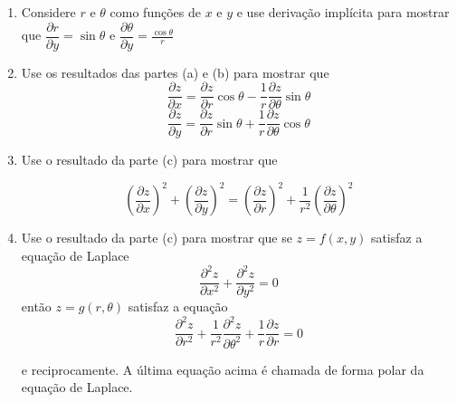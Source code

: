 \documentclass[11pt,a4paper]{article}
\begin{document}
\begin{enumerate}
\begin{enumerate}
		\item Considere $r$ e $\theta$ como funções de $x$ e $y$ e use derivação implícita para mostrar que
		$\dfrac{\partial r}{\partial y} = \sin \theta $ e $\dfrac{\partial \theta}{\partial y} = \displaystyle\frac{\cos \theta}{r}$
		
		\item Use os resultados das partes (a) e (b) para mostrar que 
		$$\dfrac{\partial z}{\partial x} = \dfrac{\partial z}{\partial r} \cos \theta - \displaystyle\frac{1}{r}\dfrac{\partial z}{\partial \theta} \sin \theta$$
		$$\dfrac{\partial z}{\partial y} = \dfrac{\partial z}{\partial r} \sin \theta + \displaystyle\frac{1}{r}\dfrac{\partial z}{\partial \theta} \cos \theta$$
		
		\item Use o resultado da parte (c) para mostrar que 
		
		 $$\left(\dfrac{\partial z}{\partial x}\right)^2 + \left(\dfrac{\partial z}{\partial y}\right)^2 = \left(\dfrac{\partial z}{\partial r}\right)^2 + \displaystyle\frac{1}{r^2}\left(\dfrac{\partial z}{\partial \theta}\right)^2$$
		
		\item Use o resultado da parte (c) para mostrar que se $z = f(x,y)$ satisfaz a equação de Laplace
		$$\dfrac{\partial^2 z}{\partial x^2} + \dfrac{\partial^2 z}{\partial y^2} = 0$$
		então $z = g(r, \theta)$ satisfaz a equação 
		$$\dfrac{\partial^2 z}{\partial r^2} + \displaystyle\frac{1}{r^2}\dfrac{\partial^2 z}{\partial \theta^2} + \displaystyle\frac{1}{r}\dfrac{\partial z}{\partial r} = 0$$
		
		e reciprocamente. A última equação acima é chamada de forma polar da equação de Laplace.
	\end{enumerate}		 
	 
	\end{enumerate}
	
\end{document}
